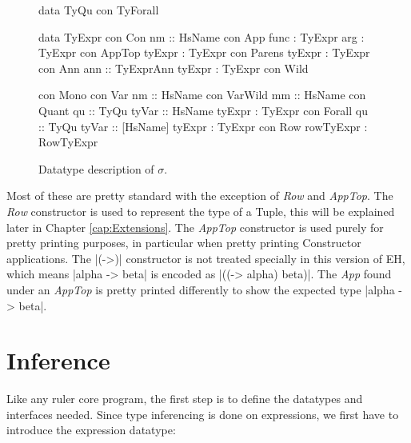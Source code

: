 \begin{figure}[H]
\begin{minipage}[t]{0.4\linewidth}
\begin{code}
data TyQu
  con TyForall
    
data TyExpr
  con Con
    nm         :: HsName
  con App      
    func       :  TyExpr
    arg        :  TyExpr
  con AppTop   
    tyExpr     :  TyExpr
  con Parens   
    tyExpr     :  TyExpr
  con Ann      
    ann        :: TyExprAnn
    tyExpr     :  TyExpr
  con Wild
\end{code}
\end{minipage}
\begin{minipage}[t]{0.6\linewidth}
\begin{code}
  con Mono
  con Var
    nm         :: HsName
  con VarWild  
    mm         :: HsName
  con Quant    
    qu         :: TyQu
    tyVar      :: HsName
    tyExpr     :  TyExpr
  con Forall   
    qu         :: TyQu
    tyVar      :: [HsName]
    tyExpr     :  TyExpr    
  con Row      
    rowTyExpr  :  RowTyExpr
\end{code}
\end{minipage}
\caption{Datatype description of $\sigma$.}
\label{abs:fig:tyexpr}
\end{figure}

Most of these are pretty standard with the exception of \emph{Row} and \emph{AppTop}. The \emph{Row} constructor is used to represent the type of a Tuple, this will be explained later in Chapter \ref{cap:Extensions}. 
The \emph{AppTop} constructor is used purely for pretty printing purposes, in particular when pretty printing Constructor applications. The |(->)| constructor is not treated specially in this version of EH, which means |alpha -> beta| is encoded as |((-> alpha) beta)|. The \emph{App} found under an \emph{AppTop} is pretty printed differently to show the expected type |alpha -> beta|.

\section{Inference}
Like any ruler core program, the first step is to define the datatypes and interfaces needed. Since type inferencing is done on expressions, we first have to introduce the expression datatype:

